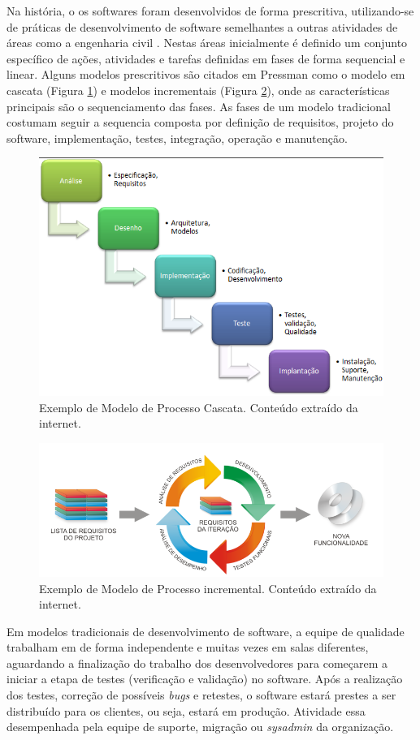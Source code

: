 Na história, o os softwares foram desenvolvidos de forma prescritiva, utilizando-se de práticas de desenvolvimento de software semelhantes a outras atividades de áreas como a engenharia civil \cite{BRAGA2015}. Nestas áreas inicialmente é definido um conjunto específico de ações, atividades e tarefas definidas em fases de forma sequencial e linear. Alguns modelos prescritivos são citados em Pressman \cite{PRESSMAN2011} como o modelo em cascata (Figura \ref{fig:figure21}) e modelos incrementais (Figura \ref{fig:figure22}), onde as características principais são o sequenciamento das fases. As fases de um modelo tradicional costumam seguir a sequencia composta por definição de requisitos, projeto do software, implementação, testes, integração, operação e manutenção.

\begin{figure}[!ht]
\centering
\includegraphics[width=.75\textwidth]{fig/figura21.png}
\caption{Exemplo de Modelo de Processo Cascata. Conteúdo extraído da internet.}
\label{fig:figure21}
\end{figure}


\begin{figure}[!ht]
\centering
\includegraphics[width=.75\textwidth]{fig/figura22.png}
\caption{Exemplo de Modelo de Processo incremental. Conteúdo extraído da internet.}
\label{fig:figure22}
\end{figure}

Em modelos tradicionais de desenvolvimento de software, a equipe de qualidade trabalham em de forma independente e muitas vezes em salas diferentes, aguardando a finalização do trabalho dos desenvolvedores para começarem a iniciar a etapa de testes (verificação e validação) no software. 
Após a realização dos testes, correção de possíveis \textit{bugs} e retestes, o software estará prestes a ser distribuído para os clientes, ou seja, estará em produção. Atividade essa desempenhada pela equipe de suporte, migração ou \textit{sysadmin} da organização.


